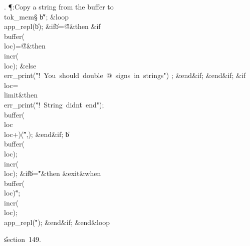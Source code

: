 . \P\?:Copy a string from the buffer to \\{tok\_mem}\X\S\?\6
\|b\?\K\?\H{"};\6
\1\&{loop}\6
\\{app\_repl}\?\1(\?\|b\?\2)\?;\6
\&{if}\1\1\8\|b\?=\?\H{@}\2\8\&{then}\6
\&{if}\1\1\8\\{buffer}\?\1(\?\\{loc}\?\2)=\?\H{@}\2\8\&{then}\6
\\{incr}\?\1(\?\\{loc}\?\2)\?;\6
\4\&{else}\6
\\{err\_print}\?\1(\?\.{"!\ You\ should\ double\ @\ signs\ in\ strings"}\?\2)%
\?;\2\6
\&{end}\8\2\&{if}\1;\2\6
\&{end}\8\2\&{if}\1;\6
\&{if}\1\1\8\\{loc}\?=\?\\{limit}\2\8\&{then}\6
\\{err\_print}\?\1(\?\.{"!\ String\ didn\'t\ end"}\?\2)\?;\6
\\{buffer}\?\1(\?\\{loc}\?\to\?\\{loc}\?+\?\2)\K\1(\?\H{"}\?,\?\2)\?;%
\2\6
\&{end}\8\2\&{if}\1;\6
\|b\?\K\?\\{buffer}\?\1(\?\\{loc}\?\2)\?;\5
\\{incr}\?\1(\?\\{loc}\?\2)\?;\6
\&{if}\1\1\8\|b\?=\?\H{"}\2\8\&{then}\6
\?\&{exit}\8\&{when}\?\8\\{buffer}\?\1(\?\\{loc}\?\2)\I\?\H{"};\6
\\{incr}\?\1(\?\\{loc}\?\2)\?;\5
\\{app\_repl}\?\1(\?\H{"}\?\2)\?;\2\6
\&{end}\8\2\&{if}\1;\2\6
\&{end}\8\&{loop}\par
\U section~149.\fi

